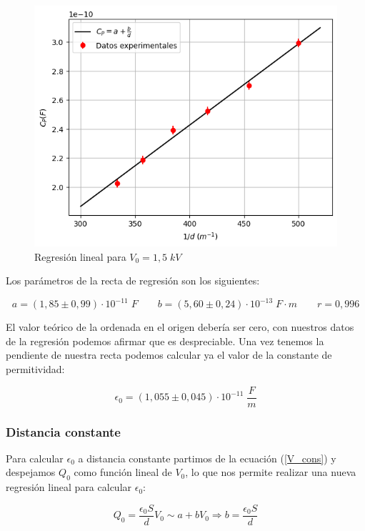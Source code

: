 \documentclass[a4paper,12pt,titlepage]{article}
\begin{document}
\begin{figure}[h!]
    \centering
    \includegraphics[width=0.65\linewidth]{v_fijo.png}
    \caption{Regresión lineal para $V_0=1,5\;kV$}
    \label{fig:enter-label}
\end{figure}

Los parámetros de la recta de regresión son los siguientes:

\begin{equation}
    a = (1,85 \pm 0,99)\cdot 10^{-11} \;F \quad \quad b = (5,60 \pm 0,24)\cdot 10^{-13} \;F\cdot m \quad \quad r = 0,996
\end{equation}

\newpage

El valor teórico de la ordenada en el origen debería ser cero, con nuestros datos de la regresión podemos afirmar que es despreciable. Una vez tenemos la pendiente de nuestra recta podemos calcular ya el valor de la constante de permitividad:

\begin{equation}
    \epsilon_0 = (1,055 \pm 0,045) \cdot 10^{-11} \;\frac{F}{m}
\end{equation}

\subsubsection{Distancia constante}

Para calcular $\epsilon_0$ a distancia constante partimos de la ecuación (\ref{V_cons}) y despejamos $Q_0$ como función lineal de $V_0$, lo que nos permite realizar una nueva regresión lineal para calcular $\epsilon_0$:

\begin{equation}
    Q_0 = \frac{\epsilon_0 S}{d} V_0 \sim a + bV_0 \Rightarrow b = \frac{\epsilon_0 S}{d}
\end{equation}
\end{document}
